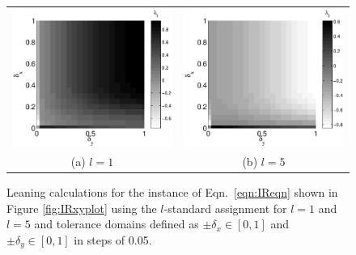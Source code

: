 \begin{figure}[ht]
\begin{tabular}{cc}
\includegraphics[scale=0.70]{NoisyResponseExample_leandifftoll1.eps} & \includegraphics[scale=0.70]{NoisyResponseExample_leandifftoll5.eps} \\
(a) $l=1$ & (b) $l=5$
\end{tabular}
\caption{Leaning calculations for the instance of Eqn.\ \ref{eqn:IReqn} shown in Figure \ref{fig:IRxyplot} using the $l$-standard assignment for $l=1$ and $l=5$ and tolerance domains defined as $\pm\delta_x\in[0,1]$ and $\pm\delta_y\in[0,1]$ in steps of 0.05.}
\label{fig:IRxyLtoldomains}
\end{figure}

